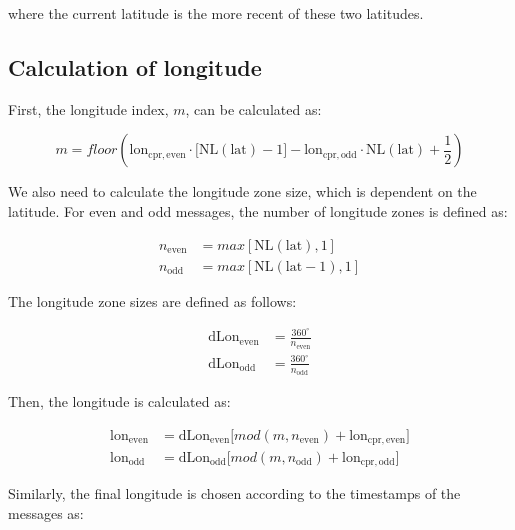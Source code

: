 where the current latitude is the more recent of these two latitudes.

\subsection{Calculation of longitude} \label{sec:cpr_airborne_global_lon}

First, the longitude index, $m$, can be calculated as:

\begin{equation}
  m = floor \left( \mathrm{lon}_\mathrm{cpr, even} \cdot \Big[ \mathrm{NL}(\mathrm{lat})-1 \Big] - \mathrm{lon}_\mathrm{cpr,odd} \cdot \mathrm{NL}(\mathrm{lat}) + \frac{1}{2}  \right)
\end{equation}


We also need to calculate the longitude zone size, which is dependent on the latitude. For even and odd messages, the number of longitude zones is defined as:

\begin{equation}
\begin{split}
  n_\mathrm{even} &= max[\mathrm{NL}(\mathrm{lat}), 1] \\
  n_\mathrm{odd} &= max[\mathrm{NL}(\mathrm{lat}-1), 1]
\end{split}
\end{equation}


The longitude zone sizes are defined as follows:

\begin{equation}
\begin{split}
  \mathrm{dLon}_\mathrm{even} &= \frac{360^\circ}{n_\mathrm{even}} \\
  \mathrm{dLon}_\mathrm{odd} &= \frac{360^\circ}{n_\mathrm{odd}}
\end{split}
\end{equation}


Then, the longitude is calculated as:

\begin{equation}
\begin{split}
  \mathrm{lon}_\mathrm{even} &= \mathrm{dLon}_\mathrm{even} \Big[ mod(m, n_\mathrm{even}) + \mathrm{lon}_\mathrm{cpr,even} \Big] \\
  \mathrm{lon}_\mathrm{odd} &= \mathrm{dLon}_\mathrm{odd} \Big[ mod(m, n_\mathrm{odd}) + \mathrm{lon}_\mathrm{cpr,odd} \Big]
  \end{split}
\end{equation}


Similarly, the final longitude is chosen according to the timestamps of the messages as:

